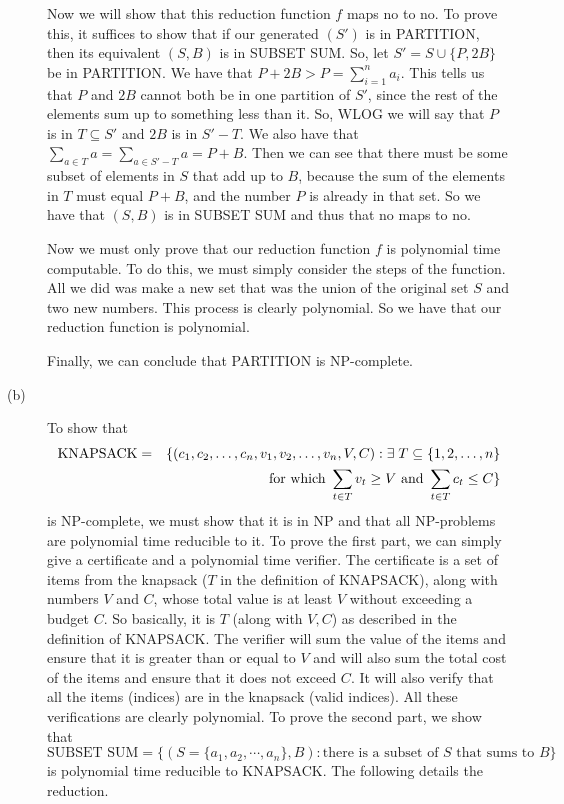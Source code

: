 \documentclass{article}
\begin{document}
\begin{description}
         Now we will show that this reduction function $f$ maps no to no. To
         prove this, it suffices to show that if our generated $(S')$ is
         in PARTITION, then its equivalent $(S,B)$ is in SUBSET SUM. So, let
         $S' = S \cup \{P, 2B\}$
         be in PARTITION. We have that $P + 2B > P = \sum_{i=1}^{n} a_i$.
         This tells us that $P$ and $2B$ cannot both be in one partition of $S'$,
         since the rest of the elements sum up to something less than it. So,
         WLOG we will say that $P$ is in $T \subseteq S'$ and $2B$ is
         in $S'-T$. We also have
         that $\sum_{a \in T} a = \sum_{a \in S' - T} a = P + B$. Then we can
         see that there must be some subset of elements in $S$ that add up to
         $B$, because the sum of the elements in $T$ must equal $P+B$, and
         the number $P$ is already in that set. So we have that $(S,B)$ is
         in SUBSET SUM and thus that no maps to no.

         Now we must only prove that our reduction function $f$ is polynomial
         time computable. To do this, we must simply consider the steps of the
         function. All we did was make a new set that was the union of the
         original set $S$ and two new numbers. This process is clearly
         polynomial. So we have that our reduction function is polynomial.

         Finally, we can conclude that PARTITION is NP-complete.
    \item[(b)]
        To show that
        \begin{eqnarray*}
            \mbox{{\text{KNAPSACK}}} & = & \{(c_1, c_2, \ldots, c_n,v_1, v_2,
                \ldots,
                v_n, V,C) : \exists \;T \subseteq \{1, 2, \ldots, n\}\\
                & &  \mbox{ for which } \sum_{t \in T}v_t \ge V \mbox{ and }
                \sum_{t \in T}c_t \le C\}
            \end{eqnarray*}
        is NP-complete, we must show that it is in NP and that all NP-problems
        are polynomial time reducible to it. To prove the first part, we can
        simply give a certificate and a polynomial time verifier. The
        certificate is a set of items from the knapsack ($T$ in the definition
        of KNAPSACK), along with numbers $V$ and $C$, whose total value is at
        least $V$ without exceeding a budget $C$. So basically, it is $T$ (along
        with $V,C$) as described in the
        definition of KNAPSACK. The verifier will sum the value of the items
        and ensure that it is greater than or equal to $V$ and will also sum
        the total cost of the items and ensure that it does not exceed $C$. It
        will also verify that all the items (indices) are in the knapsack (valid
        indices).
        All these verifications are clearly polynomial. To prove the second
        part, we show that
         \[ \text{SUBSET SUM} = \{(S = \{a_1, a_2, \cdots , a_n\}, B) : \text{
         there is a subset of $S$ that sums to $B$}\} \]
         is polynomial  time reducible to KNAPSACK. The following details the
         reduction.


\end{description}
\end{document}
